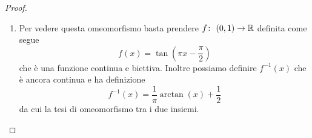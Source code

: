\begin{proof}
\begin{enumerate}
		\item Per vedere questa omeomorfismo basta prendere $f \colon\ (0,1) \rightarrow \mathbb{R}$ definita come segue
		\begin{equation*}
			f(x) = \tan\left(\pi x - \frac{\pi}{2}\right)
		\end{equation*}
		che è una funzione continua e biettiva. Inoltre possiamo definire $f^{-1}(x)$ che è ancora continua e ha definizione
		\begin{equation*}
			f^{-1}(x) = \frac{1}{\pi} \arctan(x) + \frac{1}{2} 
		\end{equation*}
		da cui la tesi di omeomorfismo tra i due insiemi.
	\end{enumerate}
\end{proof}
